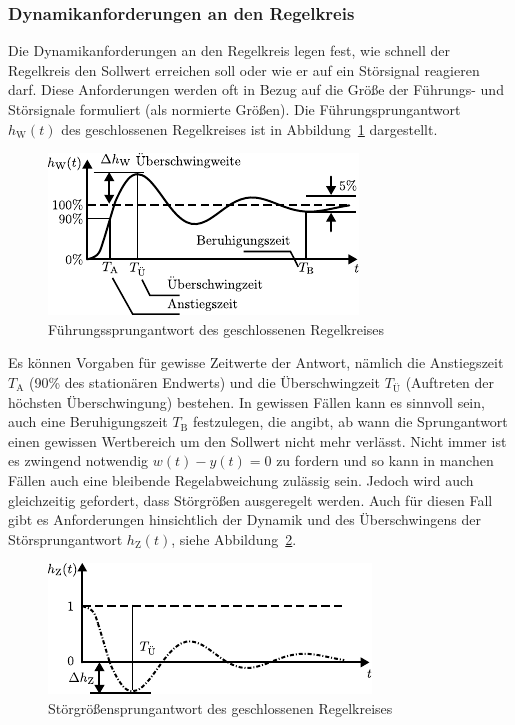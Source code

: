 \subsubsection{Dynamikanforderungen an den Regelkreis}
%
Die Dynamikanforderungen an den Regelkreis legen fest, wie schnell der Regelkreis den Sollwert erreichen soll oder wie er auf ein Störsignal reagieren darf. Diese Anforderungen werden oft in Bezug auf die Größe der Führungs- und Störsignale formuliert (als normierte Größen). Die Führungsprungantwort $h_{\text{W}}(t)$ des geschlossenen Regelkreises ist in Abbildung~\ref{fig:FuehrungsSprung} dargestellt.
%
\begin{figure}[h!]
	\centering
	\includegraphics[width=0.68\linewidth]{Abbildungen/Systemanalyse/PDF/Sollwertfolge.pdf}
	\caption{Führungssprungantwort des geschlossenen Regelkreises \cite{Lunze10}}
	\label{fig:FuehrungsSprung}
\end{figure}
%
Es können Vorgaben für gewisse Zeitwerte der Antwort, nämlich die Anstiegszeit $T_{\text{A}}$ (90\% des stationären Endwerts) und die Überschwingzeit $T_{\text{Ü}}$ (Auftreten der höchsten Überschwingung) bestehen. In gewissen Fällen kann es sinnvoll sein, auch eine Beruhigungszeit $T_\text{B}$ festzulegen, die angibt, ab wann die Sprungantwort einen gewissen Wertbereich um den Sollwert nicht mehr verlässt. Nicht immer ist es zwingend notwendig $w(t)-y(t)=0$ zu fordern und so kann in manchen Fällen auch eine bleibende Regelabweichung zulässig sein. Jedoch wird auch gleichzeitig gefordert, dass Störgrößen ausgeregelt werden. Auch für diesen Fall gibt es Anforderungen hinsichtlich der Dynamik und des Überschwingens der Störsprungantwort $h_{\text{Z}}(t)$, siehe Abbildung~\ref{fig:StoerVerhalten}.  
%
\begin{figure}[h!]
	\centering
	\includegraphics[width=0.68\linewidth]{Abbildungen/Systemanalyse/PDF/Stoergroessenausregelung.pdf}
	\caption{Störgrößensprungantwort des geschlossenen Regelkreises \cite{Lunze10}}
	\label{fig:StoerVerhalten}
\end{figure}

